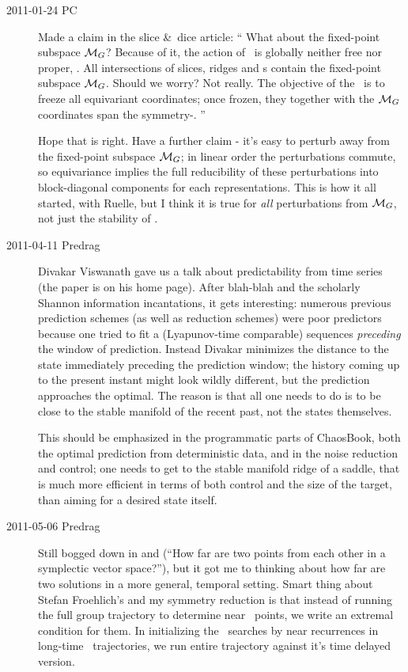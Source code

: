 \begin{description}
\item[2011-01-24 PC] Made a claim in the slice \&\ dice article:
``
What about the fixed-point subspace ${\cal M}_{G}$?
Because of it, the action of \Group\ is globally neither free nor proper,
\etc. All intersections of slices, ridges and {\sset s} contain the
fixed-point subspace ${\cal M}_{G}$. Should we worry? Not really. The
objective of the \mslices\ is to freeze all equivariant coordinates; once
frozen, they together with the  ${\cal M}_{G}$ coordinates span the
symmetry-\reducedsp.
''

Hope that is right. Have a further claim - it's easy to perturb away from
the fixed-point subspace ${\cal M}_{G}$; in linear order the perturbations
commute, so equivariance implies the full reducibility of these
perturbations into block-diagonal components for each representations.
This is how it all started, with Ruelle, but I think it is true
for \emph{all} perturbations from  ${\cal M}_{G}$, not just the stability
of \eqva.


\item[2011-04-11 Predrag]
													\toCB
Divakar Viswanath gave us a talk about predictability from
time series (the paper is on his home page). After blah-blah
and the scholarly Shannon information incantations, it gets
interesting: numerous previous prediction schemes (as well as
reduction schemes) were poor predictors because one tried to fit
a (Lyapunov-time comparable) sequences {\em preceding} the window
of prediction. Instead Divakar minimizes the distance to the
state immediately preceding the prediction window; the history
coming up to the present instant might look wildly different, but
the prediction approaches the optimal. The reason is that all
one needs to do is to be close to the stable manifold of the
recent past, not the states themselves.

This should be emphasized in the programmatic parts of ChaosBook,
both the optimal prediction from deterministic data, and in the
noise reduction and control; one needs to get to the stable manifold
ridge of a saddle, that is much more efficient in terms of both control
and the size of the target, than aiming for a desired state itself.

\item[2011-05-06 Predrag] Still bogged down in 
and  (``How far are two points from each other
in a symplectic vector space?''), but it got me to thinking about
how far are two solutions in a more general, temporal setting. Smart thing
about Stefan Froehlich's and my symmetry reduction is that instead of
running the full group trajectory to determine near \statesp\ points, we
write an extremal condition for them. In initializing
the \po\ searches by near recurrences in long-time \statesp\
trajectories, we run entire trajectory against it's time delayed version.


\end{description}
